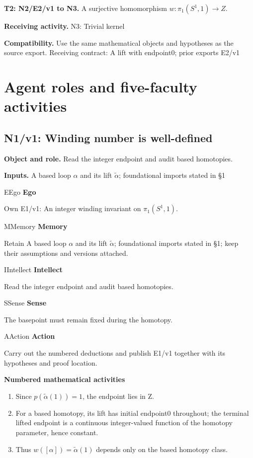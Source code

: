 \documentclass[preprint,12pt,aps,pra,showkeys,amsmath,amssymb,superscriptaddress,floatfix]{revtex4-2}
\theoremstyle{definition}
\theoremstyle{remark}
\newcommand{\mmfaculty}[3]{%
 \begin{mmfacultybox}{#1}{#2}
 {\sffamily\bfseries\color{MMBlue}#2}\par\smallskip #3
 \end{mmfacultybox}}
\newcommand{\field}[2]{\par\smallskip\noindent\textbf{#1.} #2\par}
\begin{document}
\field{T2: N2/E2/v1 to N3}{A surjective homomorphism \(w:\pi _{1}(S^{1},1)\to Z\).}

\field{Receiving activity}{N3: Trivial kernel}

\field{Compatibility}{Use the same mathematical objects and hypotheses as the source export.
Receiving contract: A lift with endpoint0; prior exports E2/v1}

\endgroup

\clearpage\section{Agent roles and five-faculty activities}\begingroup\small\linespread{1.05}\selectfont{}

\subsection{N1/v1: Winding number is well-defined}

\field{Object and role}{Read the integer endpoint and audit based homotopies.}

\field{Inputs}{A based loop \(\alpha\) and its lift \(\widetilde{\alpha}\);
foundational imports stated in §1}

\mmfaculty{E}{Ego}{Own E1/v1: An integer winding invariant on \(\pi _{1}(S^{1},1)\).}

\mmfaculty{M}{Memory}{Retain A based loop \(\alpha\) and its lift \(\widetilde{\alpha}\);
foundational imports stated in §1; keep their assumptions and versions
attached.}

\mmfaculty{I}{Intellect}{Read the integer endpoint and audit based homotopies.}

\mmfaculty{S}{Sense}{The basepoint must remain fixed during the homotopy.}

\mmfaculty{A}{Action}{Carry out the numbered deductions and publish E1/v1 together with its
hypotheses and proof location.}

\smallskip\noindent\textbf{Numbered mathematical activities}

\begin{enumerate}[label=N1.\arabic*,leftmargin=3.4em]

\item Since \(p(\widetilde{\alpha}(1))=1\), the endpoint lies in Z.

\item For a based homotopy, its lift has initial endpoint0 throughout; the
terminal lifted endpoint is a continuous integer-valued function of the
homotopy parameter, hence constant.

\item Thus \(w([\alpha ])=\widetilde{\alpha}(1)\) depends only on the based
homotopy class.

\end{enumerate}
\end{document}
